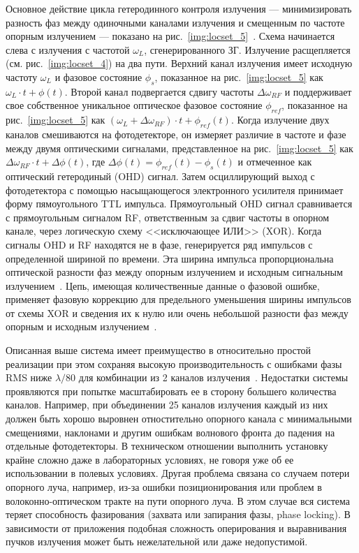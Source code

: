 Основное действие цикла гетеродинного контроля излучения ---  минимизировать разность фаз между одиночными каналами излучения и смещенным по частоте опорным излучением ---  показано на рис.~\ref{img:locset_5}~\cite{Locset20}. Схема начинается слева с излучения с частотой $\omega_L$, сгенерированного ЗГ. Излучение расщепляется (см. рис.~\ref{img:locset_4}) на два пути. Верхний канал излучения имеет исходную частоту $\omega_L$ и фазовое состояние $\phi_s$, показанное на рис.~\ref{img:locset_5} как $\omega_L\cdot t+\phi(t)$. Второй канал подвергается сдвигу частоты $\Delta\omega_{RF}$ и поддерживает свое собственное уникальное оптическое фазовое состояние $\phi_{ref}$, показанное на рис.~\ref{img:locset_5} как $(\omega_L+\Delta\omega_{RF})\cdot t+\phi_{ref}(t)$. Когда излучение двух каналов смешиваются на фотодетекторе, он измеряет различие в частоте и фазе между двумя оптическими сигналами, представленное на рис.~\ref{img:locset_5} как $\Delta\omega_{RF}\cdot t+\Delta\phi(t)$, где $\Delta\phi(t)=\phi_{ref}(t)-\phi_s(t)$ и отмеченное как оптический гетеродиный (OHD) сигнал. Затем осциллирующий выход с фотодетектора с помощью насыщающегося электронного усилителя принимает форму пямоугольного TTL импульса. Прямоугольный OHD сигнал сравнивается с прямоугольным сигналом RF, ответственным за сдвиг частоты в опорном канале, через логическую схему <<исключающее ИЛИ>> (XOR). Когда сигналы OHD и RF находятся не в фазе, генерируется ряд импульсов с определенной шириной по времени. Эта ширина импульса пропорциональна оптической разности фаз между опорным излучением и исходным сигнальным излучением~\cite{Locset20}. Цепь, имеющая количественные данные о фазовой ошибке, применяет фазовую  коррекцию для предельного уменьшения ширины импульсов от схемы XOR и сведения их к  нулю или очень небольшой разности фаз между опорным и исходным излучением~\cite{Locset20}.

Описанная выше система имеет преимущество в относительно простой реализации при этом сохраняя высокую производительность с ошибками фазы RMS ниже $\lambda/80$ для комбинации из 2 каналов излучения~\cite{Locset23}. Недостатки системы проявляются при попытке масштабировать ее в сторону большего количества каналов. Например, при объединении 25 каналов излучения каждый из них должен быть хорошо выровнен отностительно опорного канала с минимальными смещениями, наклонами и другим ошибкам волнового фронта до падения на отдельные фотодетекторы. В техническом отношении выполнить установку крайне сложно даже в лабораторных условиях, не говоря уже об ее использовании в полевых условиях. Другая проблема связана со случаем потери опорного луча, например, из-за ошибки позиционирования или проблем в волоконно-оптическом тракте на пути опорного луча. В этом случае вся система теряет способность фазирования (захвата или запирания фазы, phase locking). В зависимости от приложения подобная сложность оперирования и выравнивания пучков излучения может быть нежелательной или даже недопустимой.

